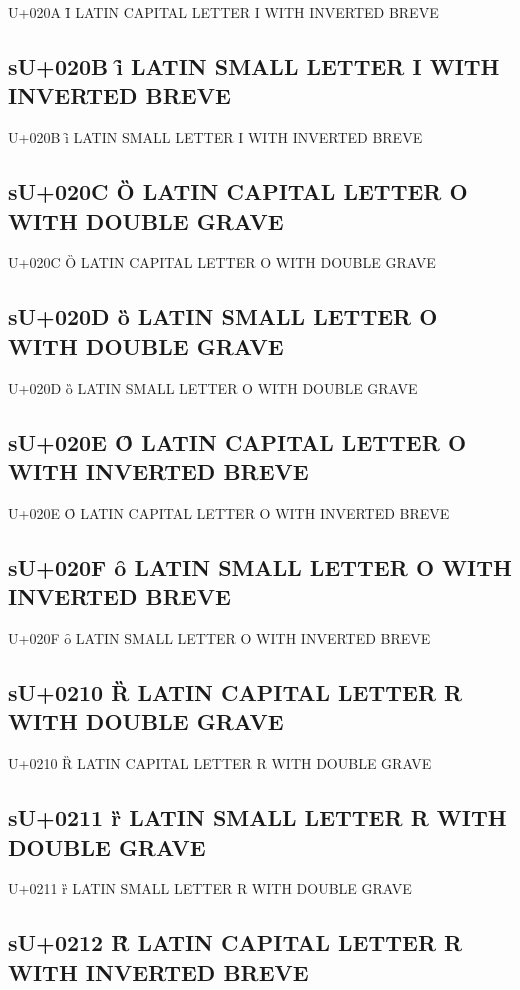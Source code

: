 U+020A Ȋ LATIN CAPITAL LETTER I WITH INVERTED BREVE

\subsection{sU+020B ȋ LATIN SMALL LETTER I WITH INVERTED BREVE}

U+020B ȋ LATIN SMALL LETTER I WITH INVERTED BREVE

\subsection{sU+020C Ȍ LATIN CAPITAL LETTER O WITH DOUBLE GRAVE}

U+020C Ȍ LATIN CAPITAL LETTER O WITH DOUBLE GRAVE

\subsection{sU+020D ȍ LATIN SMALL LETTER O WITH DOUBLE GRAVE}

U+020D ȍ LATIN SMALL LETTER O WITH DOUBLE GRAVE

\subsection{sU+020E Ȏ LATIN CAPITAL LETTER O WITH INVERTED BREVE}

U+020E Ȏ LATIN CAPITAL LETTER O WITH INVERTED BREVE

\subsection{sU+020F ȏ LATIN SMALL LETTER O WITH INVERTED BREVE}

U+020F ȏ LATIN SMALL LETTER O WITH INVERTED BREVE

\subsection{sU+0210 Ȑ LATIN CAPITAL LETTER R WITH DOUBLE GRAVE}

U+0210 Ȑ LATIN CAPITAL LETTER R WITH DOUBLE GRAVE

\subsection{sU+0211 ȑ LATIN SMALL LETTER R WITH DOUBLE GRAVE}

U+0211 ȑ LATIN SMALL LETTER R WITH DOUBLE GRAVE

\subsection{sU+0212 Ȓ LATIN CAPITAL LETTER R WITH INVERTED BREVE}

